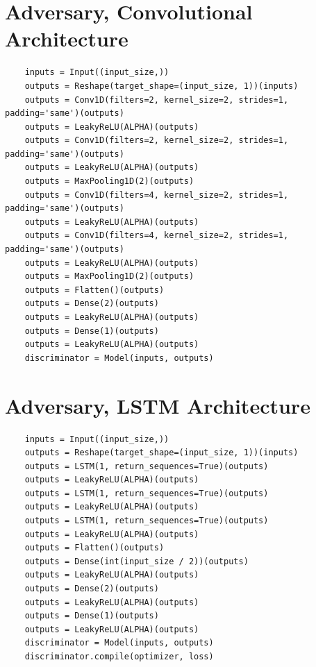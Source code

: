 \documentclass[12pt, titlepage]{report}
\theoremstyle{definition}
\begin{document}
\section{Adversary, Convolutional Architecture}\label{appendix:convolutional}
\begin{verbatim}
    inputs = Input((input_size,))
    outputs = Reshape(target_shape=(input_size, 1))(inputs)
    outputs = Conv1D(filters=2, kernel_size=2, strides=1, padding='same')(outputs)
    outputs = LeakyReLU(ALPHA)(outputs)
    outputs = Conv1D(filters=2, kernel_size=2, strides=1, padding='same')(outputs)
    outputs = LeakyReLU(ALPHA)(outputs)
    outputs = MaxPooling1D(2)(outputs)
    outputs = Conv1D(filters=4, kernel_size=2, strides=1, padding='same')(outputs)
    outputs = LeakyReLU(ALPHA)(outputs)
    outputs = Conv1D(filters=4, kernel_size=2, strides=1, padding='same')(outputs)
    outputs = LeakyReLU(ALPHA)(outputs)
    outputs = MaxPooling1D(2)(outputs)
    outputs = Flatten()(outputs)
    outputs = Dense(2)(outputs)
    outputs = LeakyReLU(ALPHA)(outputs)
    outputs = Dense(1)(outputs)
    outputs = LeakyReLU(ALPHA)(outputs)
    discriminator = Model(inputs, outputs)
\end{verbatim}

\section{Adversary, LSTM Architecture}\label{appendix:lstm}
\begin{verbatim}
    inputs = Input((input_size,))
    outputs = Reshape(target_shape=(input_size, 1))(inputs)
    outputs = LSTM(1, return_sequences=True)(outputs)
    outputs = LeakyReLU(ALPHA)(outputs)
    outputs = LSTM(1, return_sequences=True)(outputs)
    outputs = LeakyReLU(ALPHA)(outputs)
    outputs = LSTM(1, return_sequences=True)(outputs)
    outputs = LeakyReLU(ALPHA)(outputs)
    outputs = Flatten()(outputs)
    outputs = Dense(int(input_size / 2))(outputs)
    outputs = LeakyReLU(ALPHA)(outputs)
    outputs = Dense(2)(outputs)
    outputs = LeakyReLU(ALPHA)(outputs)
    outputs = Dense(1)(outputs)
    outputs = LeakyReLU(ALPHA)(outputs)
    discriminator = Model(inputs, outputs)
    discriminator.compile(optimizer, loss)
\end{verbatim}
\end{document}
